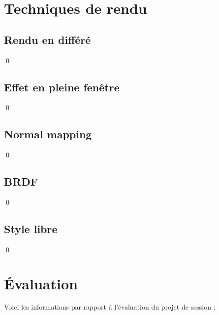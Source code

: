 \documentclass[12pt]{article}
\newcommand{\state}{\noindent}
\begin{document}
\section{Techniques de rendu}

\subsection{Rendu en différé}

\state

\qed

\subsection{Effet en pleine fenêtre}

\state

\qed

\subsection{Normal mapping}

\state

\qed

\subsection{BRDF}

\state

\qed

\subsection{Style libre}

\state

\qed

\pagebreak

\section*{Évaluation}

\state
Voici les informations par rapport à l'évaluation du projet de session :
\end{document}
